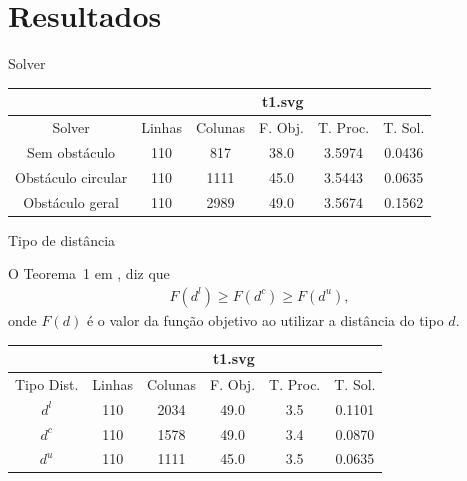 \documentclass[11pt]{beamer}
\begin{document}
\section{Resultados}
\begin{frame}{Solver}
\begin{table}
    \begin{tabular}{|c|c|c|c|c|c|}
        \hline
        & \multicolumn{5}{|c|}{t1.svg} \\ \hline
        Solver & Linhas & Colunas & F. Obj. & T. Proc. & T. Sol. \\ \hline
        Sem obstáculo & 110 & 817 & 38.0 & 3.5974 & 0.0436 \\ \hline
        Obstáculo circular & 110 & 1111 & 45.0 & 3.5443 & 0.0635 \\ \hline
        Obstáculo geral & 110 & 2989 & 49.0 & 3.5674 & 0.1562  \\ \hline
    \end{tabular}
\end{table}
\end{frame}

\begin{frame}{Tipo de distância}
\begin{block}{}
O Teorema~1 em \cite{Andjel:1989:TP}, diz que
\begin{align*}
    F(d^l) \geq F(d^c) \geq F(d^u),
\end{align*}
onde $F(d)$ é o valor da função objetivo ao utilizar a distância do tipo $d$.
\end{block}

\begin{table}
    \centering
    \begin{tabular}{|c|c|c|c|c|c|}
        \hline
        & \multicolumn{5}{|c|}{t1.svg}  \\ \hline
        Tipo Dist. & Linhas & Colunas & F. Obj. & T. Proc. & T. Sol. \\ \hline
        $d^l$ & 110 & 2034 & 49.0 & 3.5 & 0.1101 \\ \hline
        $d^c$ & 110 & 1578 & 49.0 & 3.4 & 0.0870 \\ \hline
        $d^u$ & 110 & 1111 & 45.0 & 3.5 & 0.0635 \\ \hline
    \end{tabular}        
\end{table}
\end{frame}
\end{document}
